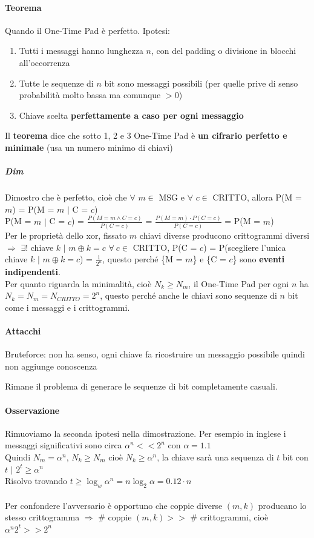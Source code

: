 \documentclass[10pt]{book}
\begin{document}
\paragraph{Teorema} Quando il One-Time Pad è perfetto. Ipotesi:
\begin{enumerate}
	\item Tutti i messaggi hanno lunghezza $n$, con del padding o divisione in blocchi all'occorrenza
	\item Tutte le sequenze di $n$ bit sono messaggi possibili (per quelle prive di senso probabilità molto bassa ma comunque $> 0$)
	\item Chiave scelta \textbf{perfettamente a caso per ogni messaggio}
\end{enumerate}
Il \textbf{teorema} dice che sotto 1, 2 e 3 One-Time Pad è \textbf{un cifrario perfetto e minimale} (usa un numero minimo di chiavi)
\subparagraph{Dim} Dimostro che è perfetto, cioè che $\forall$ $m\in$ MSG e $\forall$ $c\in$ CRITTO, allora P(M = $m$) = P(M = $m$ $|$ C = $c$)\\
P(M = $m$ $|$ C = $c$) = $\frac{P(M = m \wedge C = c)}{P(C = c)}$ = $\frac{P(M = m)\cdot P(C = c)}{P(C = c)}$ = P(M = $m$)\\
Per le proprietà dello xor, fissato $m$ chiavi diverse producono crittogrammi diversi $\Rightarrow$ $\exists!$ chiave $k$ $|$ $m\oplus k = c$
$\forall\:c\in$ CRITTO, P(C = $c$) = P(scegliere l'unica chiave $k$ $|$ $m\oplus k = c$) = $\frac{1}{2^n}$, questo perché \{M = $m$\} e \{C = $c$\} sono \textbf{eventi indipendenti}.\\
Per quanto riguarda la minimalità, cioè $N_k \geq N_m$, il One-Time Pad per ogni $n$ ha $N_k = N_m = N_{CRITTO} = 2^n$, questo perché anche le chiavi sono sequenze di $n$ bit come i messaggi e i crittogrammi.
\paragraph{Attacchi}
\begin{list}{}{}
	\item Bruteforce: non ha senso, ogni chiave fa ricostruire un messaggio possibile quindi non aggiunge conoscenza
\end{list}
Rimane il problema di generare le sequenze di bit completamente casuali.
\paragraph{Osservazione} Rimuoviamo la seconda ipotesi nella dimostrazione. Per esempio in inglese i messaggi significativi sono circa $\alpha^n << 2^n$ con $\alpha = 1.1$\\
Quindi $N_m = \alpha^n$, $N_k\geq N_m$ cioè $N_k\geq \alpha^n$, la chiave sarà una sequenza di $t$ bit con $t$ $|$ $2^t \geq \alpha^n$\\
Risolvo trovando $t \geq \log_w \alpha^n = n \log_2 \alpha = 0.12\cdot n$\\\\
Per confondere l'avversario è opportuno che coppie diverse $(m,k)$ producano lo stesso crittogramma $\Rightarrow$ \# coppie $(m,k) >>$ \# crittogrammi, cioè $\alpha^n 2^t >> 2^n$
\pagebreak
\end{document}
